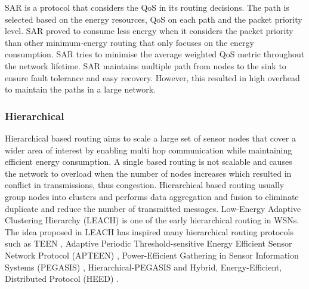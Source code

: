 SAR is a protocol that considers the QoS in its routing decisions. The path is selected based on the energy resources, QoS on each path and the packet priority level. SAR proved to consume less energy when it considers the packet priority than other minimum-energy routing that only focuses on the energy consumption. SAR tries to minimise the average weighted QoS metric throughout the network lifetime. SAR maintains multiple path from nodes to the sink to ensure fault tolerance and easy recovery. However, this resulted in high overhead to maintain the paths in a large network. 


\subsubsection{Hierarchical}
Hierarchical based routing aims to scale a large set of sensor nodes that cover a wider area of interest by enabling multi hop communication while maintaining efficient energy consumption. A single based routing is not scalable and causes the network to overload when the number of nodes increases which resulted in conflict in transmissions, thus congestion. Hierarchical based routing usually group nodes into clusters and performs data aggregation and fusion to eliminate duplicate and reduce the number of transmitted messages. Low-Energy Adaptive Clustering Hierarchy (LEACH) \cite{lifetimedef2} is one of the early hierarchical routing in WSNs. The idea proposed in LEACH has inspired many hierarchical routing protocols such as TEEN \cite{teen}, Adaptive Periodic Threshold-sensitive Energy Efficient Sensor Network Protocol (APTEEN) \cite{apteen}, Power-Efficient Gathering in Sensor Information Systems (PEGASIS) \cite{pegasis}, Hierarchical-PEGASIS \cite{hpegasis} and Hybrid, Energy-Efficient, Distributed Protocol (HEED) \cite{heed}. 

